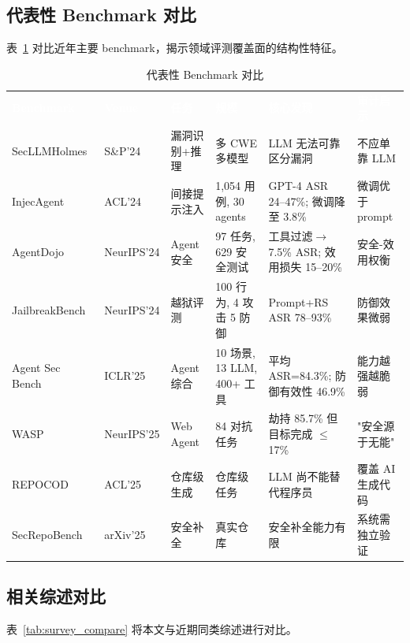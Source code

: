 \documentclass[11pt,a4paper,onecolumn]{article}
\newcommand{\tabheader}[1]{\textcolor{white}{\textbf{#1}}}
\begin{document}
\subsection{代表性 Benchmark 对比}
表~\ref{tab:bench_compare} 对比近年主要 benchmark，揭示领域评测覆盖面的结构性特征。

\begin{table}[t]
\caption{代表性 Benchmark 对比}
\label{tab:bench_compare}
\centering
\begin{tabularx}{\textwidth}{@{} p{}p{}X X X X @{}}
\rowcolor{tabhead}
\tabheader{Benchmark} & \tabheader{Venue} & \tabheader{任务} & \tabheader{规模} & \tabheader{核心发现} & \tabheader{审计启示} \\
\rowcolor{tabalt} SecLLMHolmes~\cite{paquette2024llmscannot} & S\&P'24 & 漏洞识别+推理 & 多 CWE 多模型 & LLM 无法可靠区分漏洞 & 不应单靠 LLM \\
InjecAgent~\cite{zhan2024injecagent} & ACL'24 & 间接提示注入 & 1,054 用例, 30 agents & GPT-4 ASR 24--47\%; 微调降至 3.8\% & 微调优于 prompt \\
\rowcolor{tabalt} AgentDojo~\cite{debenedetti2024agentdojo} & NeurIPS'24 & Agent 安全 & 97 任务, 629 安全测试 & 工具过滤$\to$7.5\% ASR; 效用损失 15--20\% & 安全-效用权衡 \\
JailbreakBench~\cite{chao2024jailbreakbench} & NeurIPS'24 & 越狱评测 & 100 行为, 4 攻击 5 防御 & Prompt+RS ASR 78--93\% & 防御效果微弱 \\
\rowcolor{tabalt} Agent Sec Bench~\cite{zhang2024asb} & ICLR'25 & Agent 综合 & 10 场景, 13 LLM, 400+ 工具 & 平均 ASR=84.3\%; 防御有效性 46.9\% & 能力越强越脆弱 \\
WASP~\cite{evtimov2025wasp} & NeurIPS'25 & Web Agent & 84 对抗任务 & 劫持 85.7\% 但目标完成 $\leq$17\% & "安全源于无能" \\
\rowcolor{tabalt} REPOCOD~\cite{repocod2025} & ACL'25 & 仓库级生成 & 仓库级任务 & LLM 尚不能替代程序员 & 覆盖 AI 生成代码 \\
SecRepoBench~\cite{secrepobench2025} & arXiv'25 & 安全补全 & 真实仓库 & 安全补全能力有限 & 系统需独立验证 \\
\end{tabularx}
\end{table}

\subsection{相关综述对比}
表~\ref{tab:survey_compare} 将本文与近期同类综述进行对比。
\end{document}
